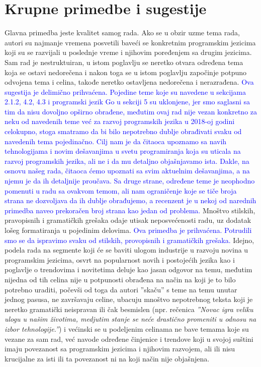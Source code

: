 \documentclass[a4paper]{report}
\newcommand{\odgovor}[1]{\textcolor{blue}{#1}}
\begin{document}
\section{Krupne primedbe i sugestije}
\label{sec:krupno}
Glavna primedba jeste kvalitet samog rada. Ako se u obzir uzme tema rada, autori su najmanje vremena posvetili baveći se konkretnim programskim jezicima koji su se razvijali u poslednje vreme i njihovim poređenjem sa drugim jezicima. Sam rad je nestruktuiran, u istom poglavlju se neretko otvara određena tema koja se ostavi nedorečena i nakon toga se u istom poglavlju započinje potpuno odvojena tema i celina, takođe neretko ostavljena nedorečena i nerazrađena. 
\odgovor{Ova sugestija je delimično prihvaćena. Pojedine teme koje su navedene u sekcijama 2.1.2, 4.2, 4.3 i programski jezik Go u sekciji 5 su uklonjene, jer smo saglasni sa tim da nisu dovoljno opširno obrađene, međutim ovaj rad nije vezan konkretno za neku od navedenih teme već za razvoj programskih jezika u 2018-oj godini celokupno, stoga smatramo da bi bilo nepotrebno dublje obrađivati svaku od navedenih tema pojedinačno. Cilj nam je da čitaoca upoznamo sa navih tehnologijama i novim dešavanjima u svetu programiranja koja su uticala na razvoj programskih jezika, ali ne i da mu detaljno objašnjavamo ista. Dakle, na osnovu našeg rada, čitaoca ćemo upoznati sa svim aktuelnim dešavanjima, a na njemu je da ih detaljnije proučava. Sa druge strane, određene teme je neophodno pomenuti u radu sa ovakvom temom, ali nam ograničenje koje se tiče broja strana ne dozvoljava da ih dublje obrađujemo, a recenzent je u nekoj od narednih primedba naveo prekoračen broj strana kao jedan od problema. }
Mnoštvo stilskih, pravopisnih i gramatičkih grešaka odaje utisak neposvećenosti radu, uz dodatak lošeg formatiranja u pojedinim delovima. 
\odgovor{Ova primedba je prihvaćena. Potrudili smo se da ispravimo svaku od stilskih, provopisnih i gramatičkih grešaka.}
Idejno, podela rada na segmente koji će se baviti ulogom industrije u razvoju novina u programskim jezicima, osvrt na popularnost novih i postojećih jezika kao i poglavlje o trendovima i novitetima deluje kao jasan odgovor na temu, međutim nijedna od tih celina nije u potpunosti obrađena na način na koji je to bilo potrebno uraditi, počevši od toga da autori ''skaču'' s teme na temu unutar jednog pasusa, ne završavaju celine, ubacuju mnoštvo nepotrebnog teksta koji je neretko gramatički neispravan ili čak besmislen (npr. rečenica \textit{''Novac igra veliku ulogu u našim životima, medjutim stanje se neće drastično promeniti u odnosu na izbor tehnologije.''}) i većinski se u podeljenim celinama ne bave temama koje su vezane za sam rad, već navode određene činjenice i trendove koji u svojoj suštini imaju povezanost sa programskim jezicima i njihovim razvojem, ali ili nisu krucijalne za isti ili ta povezanost ni na koji način nije objašnjena.
\end{document}
